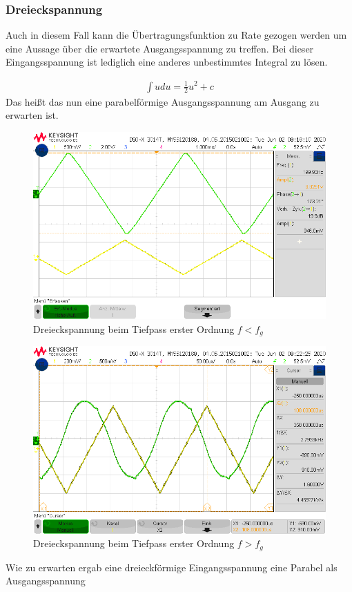 \subsubsection{Dreieckspannung}
Auch in diesem Fall kann die Übertragungsfunktion zu Rate gezogen werden um eine Aussage über die erwartete Ausgangsspannung zu treffen. Bei dieser Eingangsspannung ist lediglich eine anderes unbestimmtes Integral zu lösen.

\begin{align}
    \int{u du} = \frac{1}{2} u^2 + c
\end{align}
Das heißt das nun eine parabelförmige Ausgangsspannung am Ausgang zu erwarten ist.

\begin{figure}[H]
    \centering
    \includegraphics[width=\costumPicWidth]{Lab_2/Messungen/TP_first_order/scope_30.png}
    \caption{Dreieckspannung beim Tiefpass erster Ordnung $f < f_g$}
    \label{fig:Dreieck_Tiefpass_erster_Ordnung_small_f}
\end{figure}
\begin{figure}[H]
    \centering
    \includegraphics[width=\costumPicWidth]{Lab_2/Messungen/TP_first_order/scope_34.png}
    \caption{Dreieckspannung beim Tiefpass erster Ordnung $f > f_g$}
    \label{fig:Dreieck_Tiefpass_erster_Ordnung_big_f}
\end{figure}
Wie zu erwarten ergab eine dreieckförmige Eingangsspannung eine Parabel als Ausgangsspannung

